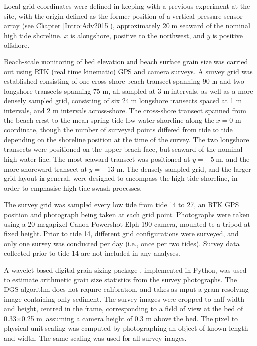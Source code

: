 Local grid coordinates were defined in keeping with a previous experiment at the site, with the origin defined as the former position of a vertical pressure sensor array (see Chapter \ref{Intro:Adv2015}), approximately 20 m seaward of the nominal high tide shoreline. $x$ is alongshore, positive to the northwest, and $y$ is positive offshore.

Beach-scale monitoring of bed elevation and beach surface grain size was carried out using RTK (real time kinematic) GPS and camera surveys. A survey grid was established consisting of one cross-shore beach transect spanning 90 m and two longshore transects spanning 75 m, all sampled at 3 m intervals, as well as a more densely sampled grid, consisting of six 24 m longshore transects spaced at 1 m intervals, and 2 m intervals across-shore. The cross-shore transect spanned from the beach crest to the mean spring tide low water shoreline along the $x=0$ m coordinate, though the number of surveyed points differed from tide to tide depending on the shoreline position at the time of the survey. The two longshore transects were positioned on the upper beach face, but seaward of the nominal high water line. The most seaward transect was positioned at $y=-5$ m, and the more shoreward transect at $y=-13$ m. The densely sampled grid, and the larger grid layout in general, were designed to encompass the high tide shoreline, in order to emphasise high tide swash processes. 

The survey grid was sampled every low tide from tide 14 to 27, an RTK GPS position and photograph being taken at each grid point. Photographs were taken using a 20 megapixel Canon Powershot Elph 190 camera, mounted to a tripod at fixed height. Prior to tide 14, different grid configurations were surveyed, and only one survey was conducted per day (i.e., once per two tides). Survey data collected prior to tide 14 are not included in any analyses. 

A wavelet-based digital grain sizing package \citep[see][]{Buscombe2013}, implemented in Python, was used to estimate arithmetic grain size statistics from the survey photographs. The DGS algorithm does not require calibration, and takes as input a grain-resolving image containing only sediment. The survey images were cropped to half width and height, centred in the frame, corresponding to a field of view at the bed of 0.33$\times$0.25 m, assuming a camera height of 0.3 m above the bed. The pixel to physical unit scaling was computed by photographing an object of known length and width. The same scaling was used for all survey images.  

